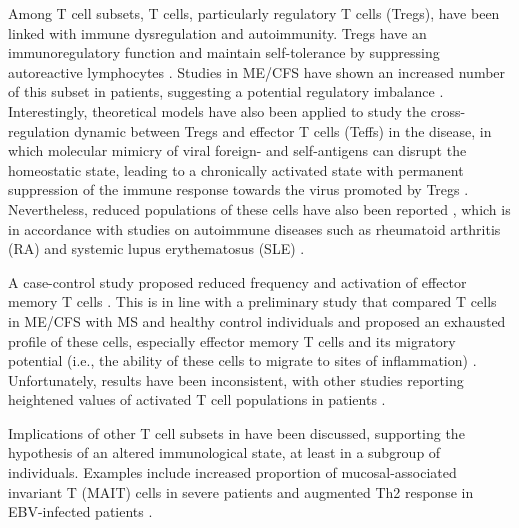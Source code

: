 Among T cell subsets, \cdfour T cells, particularly regulatory T cells (Tregs), have been linked with immune dysregulation and autoimmunity.
Tregs have an immunoregulatory function and maintain self-tolerance by suppressing autoreactive lymphocytes \citep{janeway2017Immunology}.
Studies in ME/CFS have shown an increased number of this subset in patients, suggesting a potential regulatory imbalance \citep{brenu2014RoleAdaptive, ramosRegulatoryNaturalKiller2016}.
Interestingly, theoretical models have also been applied to study the cross-regulation dynamic between Tregs and effector T cells (Teffs) in the disease, in which molecular mimicry of viral foreign- and self-antigens can disrupt the homeostatic state, leading to a chronically activated state with permanent suppression of the immune response towards the virus promoted by Tregs \citep{sepulveda2015CurrentMathematical}.
Nevertheless, reduced populations of these cells have also been reported \citep{rivasAssociationNKCell2018}, which is in accordance with studies on autoimmune diseases such as rheumatoid arthritis (RA) \citep{yan2022RegulatoryCells} and systemic lupus erythematosus (SLE) \citep{barreto2009LowFrequency}.

A case-control study proposed reduced frequency and activation of effector memory T cells \citep{curriu2013ScreeningNK}.
This is in line with a preliminary study that compared \cdeight T cells in ME/CFS with MS and healthy control individuals and proposed an exhausted profile of these cells, especially effector memory \cdeight T cells and its migratory potential (i.e., the ability of these cells to migrate to sites of inflammation) \citep{brenu2016PreliminaryComparative}.
Unfortunately, results have been inconsistent, with other studies reporting heightened values of activated \cdeight T cell populations in patients \citep{landay1991ChronicFatigue}.

Implications of other T cell subsets in \cfs have been discussed, supporting the hypothesis of an altered immunological state, at least in a subgroup of individuals.
Examples include increased proportion of mucosal-associated invariant \cdeight T (MAIT) cells in severe patients \citep{cliff2019CellularImmune} and augmented Th2 response in EBV-infected patients \citep{ruiz-pablos2021EpsteinBarrVirus}.


